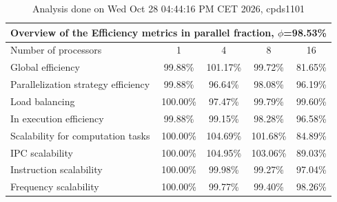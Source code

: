 \begin{table}[h]
\begin{center}
\begin{tabular}{|l|c|c|c|c|}
\hline
\multicolumn{5}{|c|}{Overview of the Efficiency metrics in parallel fraction, $\phi$=98.53\%} \\
\hline
\hline
Number of processors & 1 & 4 & 8 & 16 \\
\hline
\hline
Global efficiency                      &     99.88\% &    101.17\% &     99.72\% &     81.65\% \\
\hline
\hline
Parallelization strategy efficiency &     99.88\% &     96.64\% &     98.08\% &     96.19\% \\
\hline
Load balancing                   &    100.00\% &     97.47\% &     99.79\% &     99.60\% \\
In execution efficiency          &     99.88\% &     99.15\% &     98.28\% &     96.58\% \\
\hline
\hline
Scalability for computation tasks   &    100.00\% &    104.69\% &    101.68\% &     84.89\% \\
\hline
IPC scalability                  &    100.00\% &    104.95\% &    103.06\% &     89.03\% \\
Instruction scalability          &    100.00\% &     99.98\% &     99.27\% &     97.04\% \\
Frequency scalability            &    100.00\% &     99.77\% &     99.40\% &     98.26\% \\
\hline
\end{tabular}
\end{center}
\caption{ Analysis done on Wed Oct 28 04:44:16 PM CET 2026, cpds1101}
\end{table}
